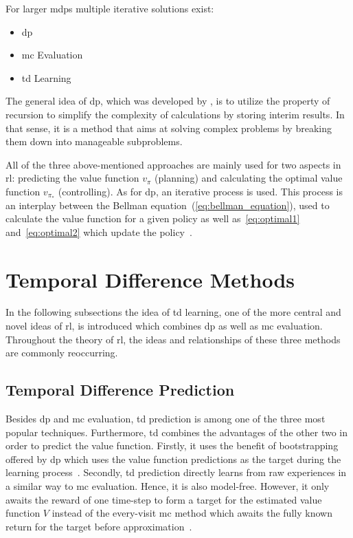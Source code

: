 \documentclass[draft,final]{vutinfth} %
\newcommand{\pautoref}[1]{(\autoref{#1})}
\newcommand{\p}[1]{see p. #1}
\begin{document}
    For larger \glspl{mdp} multiple iterative solutions exist:
    \begin{itemize}
        \item \gls{dp}
        \item \gls{mc} Evaluation
        \item \gls{td} Learning
    \end{itemize}

    The general idea of \gls{dp}, which was developed by \citeauthor{bellman_theory_1954}, is to utilize the property of recursion to simplify the complexity of calculations by storing interim results.
    In that sense, it is a method that aims at solving complex problems by breaking them down into manageable subproblems.

    All of the three above-mentioned approaches are mainly used for two aspects in \gls{rl}: predicting the value function $v_\pi$ (planning) and calculating the optimal value function $v_{\pi_*}$ (controlling).
    As for \gls{dp}, an iterative process is used.
    This process is an interplay between the Bellman equation~\pautoref{eq:bellman_equation}, used to calculate the value function for a given policy as well as~\autoref{eq:optimal1} and~\autoref{eq:optimal2} which update the policy~.


    \section{Temporal Difference Methods}

    In the following subsections the idea of \gls{td} learning, one of the more central and novel ideas of \gls{rl}, is introduced which combines \gls{dp} as well as \gls{mc} evaluation.
    Throughout the theory of \gls{rl}, the ideas and relationships of these three methods are commonly reoccurring.

    \subsection{Temporal Difference Prediction}
    Besides \gls{dp} and \gls{mc} evaluation, \gls{td} prediction is among one of the three most popular techniques.
    Furthermore, \gls{td} combines the advantages of the other two in order to predict the value function.
    Firstly, it uses the benefit of bootstrapping offered by \gls{dp} which uses the value function predictions as the target during the learning process~\citep[\p{18}]{szepesvari_algorithms_2010}.
    Secondly, \gls{td} prediction directly learns from raw experiences in a similar way to \gls{mc} evaluation.
    Hence, it is also model-free.
    However, it only awaits the reward of one time-step to form a target for the estimated value function $V$ instead of the every-visit \gls{mc} method which awaits the fully known return for the target before approximation~\citep[\p{120}]{sutton_reinforcement_2018}.
\end{document}
